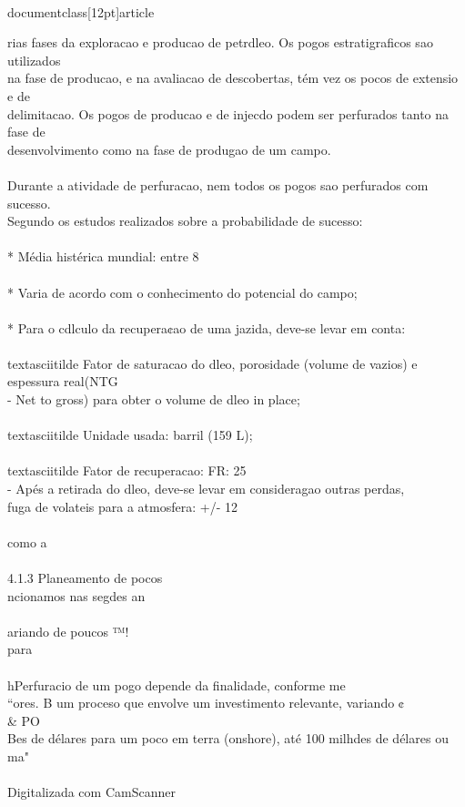 \\documentclass[12pt]{article}
\begin{document}
{rias fases da exploracao e producao de petrdleo. Os pogos estratigraficos sao utilizados\\
na fase de producao, e na avaliacao de descobertas, tém vez os pocos de extensio e de\\
delimitacao. Os pogos de producao e de injecdo podem ser perfurados tanto na fase de\\
desenvolvimento como na fase de produgao de um campo.\\
\\
Durante a atividade de perfuracao, nem todos os pogos sao perfurados com sucesso.\\
Segundo os estudos realizados sobre a probabilidade de sucesso:\\
\\
* Média histérica mundial: entre 8\\%
\\
* Varia de acordo com o conhecimento do potencial do campo;\\
\\
* Para o cdlculo da recupera¢ao de uma jazida, deve-se levar em conta:\\
\\textasciitilde{} Fator de saturacao do dleo, porosidade (volume de vazios) e espessura real(NTG\\
- Net to gross) para obter o volume de dleo in place;\\
\\textasciitilde{} Unidade usada: barril (159 L);\\
\\textasciitilde{} Fator de recuperacao: FR: 25\\%
- Apés a retirada do dleo, deve-se levar em consideragao outras perdas,\\
fuga de volateis para a atmosfera: +/- 12\\%
\\
como a\\
\\
4.1.3 Planeamento de pocos\\
ncionamos nas segdes an\\
\\
ariando de poucos ™!\\
para\\
\\
hPerfuracio de um pogo depende da finalidade, conforme me\\
“ores. B um proceso que envolve um investimento relevante, variando ¢\\& PO\\
Bes de délares para um poco em terra (onshore), até 100 milhdes de délares ou ma"\\
\\
Digitalizada com CamScanner\\

}
\end{document}
